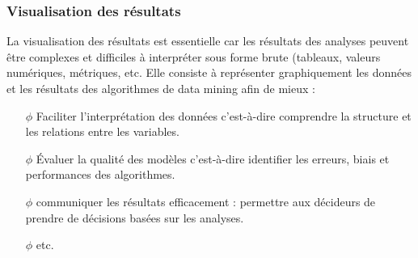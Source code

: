 \documentclass[a4paper, 12pt]{article}
\begin{document}
	\subsubsection{	Visualisation des résultats}
	La visualisation des résultats  est essentielle car les résultats des analyses peuvent être complexes et difficiles à interpréter sous forme brute (tableaux, valeurs numériques, métriques, etc. Elle consiste à représenter graphiquement les données et les résultats des algorithmes de data mining afin de mieux :
	\begin{itemize}
		\item[$\phi$] \justifying Faciliter l’interprétation des données c’est-à-dire comprendre la structure et les relations entre les variables.
		\item[$\phi$] \justifying Évaluer la qualité des modèles c’est-à-dire identifier les erreurs, biais et performances des algorithmes.
		\item[$\phi$] \justifying communiquer les résultats efficacement : permettre aux décideurs de prendre de décisions basées sur les analyses.
		\item[$\phi$] \justifying etc. 
	\end{itemize}
\end{document}
